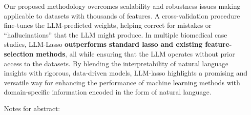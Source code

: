 Our proposed methodology overcomes scalability and robustness issues making applicable to datasets with thousands of features. A cross-validation procedure fine-tunes the LLM-predicted weights, helping correct for mistakes or “hallucinations” that the LLM might produce. In multiple biomedical case studies, LLM-Lasso \textbf{outperforms standard lasso and existing feature-selection methods}, all while ensuring that the LLM operates without prior access to the datasets. By blending the interpretability of natural language insights with rigorous, data-driven models, LLM-lasso highlights a promising and versatile way for enhancing the performance of machine learning methods with domain-specific information encoded in the form of natural language.





Notes for abstract:

